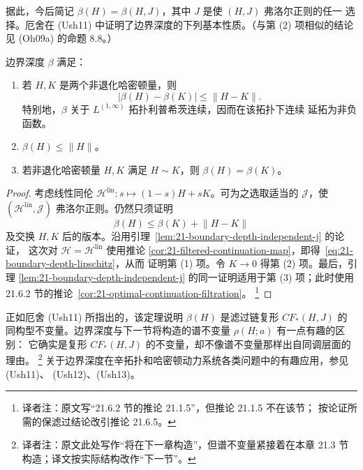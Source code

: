 据此，今后简记 $\beta(H)=\beta(H,J)$，其中 $J$ 是使 $(H,J)$ 弗洛尔正则的任一
选择。厄舍在 (Ush11) 中证明了边界深度的下列基本性质。（与第 (2) 项相似的结论
见 (Oh09a) 的命题 8.8。）

\begin{theorem}[厄舍]
\label{thm:21-boundary-depth-properties}
边界深度 $\beta$ 满足：
\begin{enumerate}[label=(\arabic*)]
 \item 若 $H,K$ 是两个非退化哈密顿量，则
 \[
  |\beta(H)-\beta(K)|\leq\lVert H-K\rVert.
 \]
 特别地，$\beta$ 关于 $L^{(1,\infty)}$ 拓扑利普希茨连续，因而在该拓扑下连续
 延拓为非负函数。
 \item $\beta(H)\leq\lVert H\rVert$。
 \item 若非退化哈密顿量 $H,K$ 满足 $H\sim K$，则 $\beta(H)=\beta(K)$。
\end{enumerate}
\end{theorem}

\begin{proof}
考虑线性同伦 $\mathcal H^{\mathrm{lin}}:s\mapsto(1-s)H+sK$。可为之选取适当的
$\mathcal J$，使 $(\mathcal H^{\mathrm{lin}},\mathcal J)$ 弗洛尔正则。仍然只须证明
\begin{equation}
 \beta(H)\leq\beta(K)+\lVert H-K\rVert
 \label{eq:21-boundary-depth-lipschitz}
\end{equation}
及交换 $H,K$ 后的版本。沿用引理~\ref{lem:21-boundary-depth-independent-j} 的论证，
这次对 $\mathcal H=\mathcal H^{\mathrm{lin}}$ 使用推论
\ref{cor:21-filtered-continuation-map}，即得~\eqref{eq:21-boundary-depth-lipschitz}，从而
证明第 (1) 项。令 $K\to0$ 得第 (2) 项。最后，引理
\ref{lem:21-boundary-depth-independent-j} 的同一证明适用于第 (3) 项；此时使用
21.6.2 节的推论~\ref{cor:21-optimal-continuation-filtration}。
\footnote{译者注：原文写“21.6.2 节的推论 21.1.5”，但推论 21.1.5 不在该节；
按论证所需的保滤过结论改引推论 21.6.5。}
\end{proof}

正如厄舍 (Ush11) 所指出的，该定理说明 $\beta(H)$ 是滤过链复形 $CF_*(H,J)$ 的
同构型不变量。边界深度与下一节将构造的谱不变量 $\rho(H;a)$ 有一点有趣的区别：
它确实是复形 $CF_*(H,J)$ 的不变量，却不像谱不变量那样出自同调层面的理由。
\footnote{译者注：原文此处写作“将在下一章构造”，但谱不变量紧接着在本章
21.3 节构造；译文按实际结构改作“下一节”。}
关于边界深度在辛拓扑和哈密顿动力系统各类问题中的有趣应用，参见 (Ush11)、
(Ush12)、(Ush13)。
